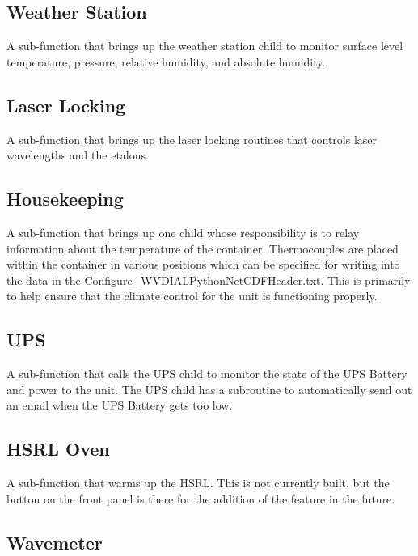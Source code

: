 \subsection{Weather Station}\label{Sec:WSSubFunction}

A sub-function that brings up the weather station child to monitor surface level temperature, pressure, relative humidity, and absolute humidity. 

\subsection{Laser Locking}\label{Sec:LLSubFunction}

A sub-function that brings up the laser locking routines that controls laser wavelengths and the etalons. 

\subsection{Housekeeping}\label{Sec:HousekeepingSubFunction}

A sub-function that brings up one child whose responsibility is to relay information about the temperature of the container. Thermocouples are placed within the container in various positions which can be specified for writing into the data in the Configure\_WVDIALPythonNetCDFHeader.txt. This is primarily to help ensure that the climate control for the unit is functioning properly. 

\subsection{UPS}\label{Sec:UPSSubFunction}

A sub-function that calls the UPS child to monitor the state of the UPS Battery and power to the unit. The UPS child has a subroutine to automatically send out an email when the UPS Battery gets too low. 

\subsection{HSRL Oven}\label{Sec:HSRLOvenSubFunction}

A sub-function that warms up the HSRL. This is not currently built, but the button on the front panel is there for the addition of the feature in the future. 

\subsection{Wavemeter}\label{Sec:WavemeterSubFunction}

